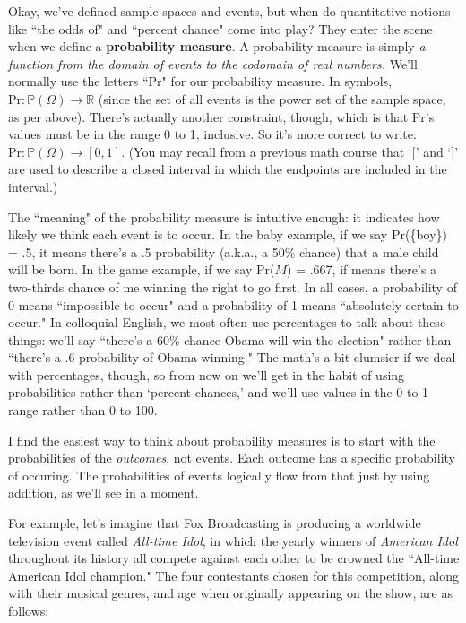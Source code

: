 
Okay, we've defined sample spaces and events, but when do quantitative
notions like ``the odds of" and ``percent chance" come into play? They
enter the scene when we define a \textbf{probability measure}. A
probability measure is simply \textit{a function from the domain of events
to the codomain of real numbers.} We'll normally use the letters ``Pr" for
our probability measure. In symbols, $\text{Pr}:\mathbb{P}(\Omega) \to
\mathbb{R}$ (since the set of all events is the power set of the sample
space, as per above). There's actually another constraint, though, which is
that Pr's values must be in the range 0 to 1, inclusive. So it's more
correct to write: $\text{Pr}:\mathbb{P}(\Omega)\to [0,1]$. (You may recall
from a previous math course that `[' and `]' are used to describe a closed
interval in which the endpoints are included in the interval.)

The ``meaning" of the probability measure is intuitive enough: it indicates
how likely we think each event is to occur. In the baby example, if we say
Pr(\{boy\}) = .5, it means there's a .5 probability (a.k.a., a 50\% chance)
that a male child will be born. In the game example, if we say Pr($M$) =
.667, if means there's a two-thirds chance of me winning the right to go
first. In all cases, a probability of 0 means ``impossible to occur" and a
probability of 1 means ``absolutely certain to occur." In colloquial
English, we most often use percentages to talk about these things: we'll
say ``there's a 60\% chance Obama will win the election" rather than
``there's a .6 probability of Obama winning." The math's a bit clumsier
if we deal with percentages, though, so from now on we'll get in the
habit of using probabilities rather than `percent chances,' and we'll use
values in the 0 to 1 range rather than 0 to 100.

I find the easiest way to think about probability measures is to start with
the probabilities of the \textit{outcomes}, not events. Each outcome has a
specific probability of occuring. The probabilities of events logically
flow from that just by using addition, as we'll see in a moment. 

For example, let's imagine that Fox Broadcasting is producing a worldwide
television event called \textit{All-time Idol}, in which the yearly winners
of \textit{American Idol} throughout its history all compete against each
other to be crowned the ``All-time American Idol champion." The four
contestants chosen for this competition, along with their musical genres,
and age when originally appearing on the show, are as follows:

